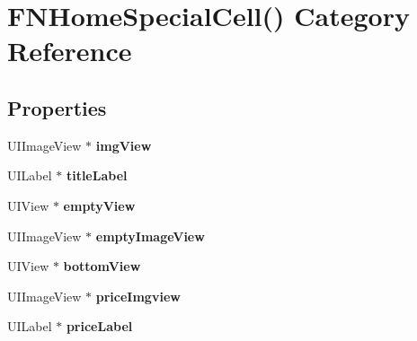 \hypertarget{category_f_n_home_special_cell_07_08}{}\section{F\+N\+Home\+Special\+Cell() Category Reference}
\label{category_f_n_home_special_cell_07_08}
\subsection*{Properties}
\begin{DoxyCompactItemize}
\item 
\mbox{\label{category_f_n_home_special_cell_07_08_af0912094a56bb610add6d24d1e4982bb}} 
U\+I\+Image\+View $\ast$ {\bfseries img\+View}
\item 
\mbox{\label{category_f_n_home_special_cell_07_08_a7600d0d2ad0559ccabb48b75d3b91689}} 
U\+I\+Label $\ast$ {\bfseries title\+Label}
\item 
\mbox{\label{category_f_n_home_special_cell_07_08_a2e7b3476d2f3237d1d7af102e45b6bee}} 
U\+I\+View $\ast$ {\bfseries empty\+View}
\item 
\mbox{\label{category_f_n_home_special_cell_07_08_a4c26b07a8860b2d004eea0a2887d9436}} 
U\+I\+Image\+View $\ast$ {\bfseries empty\+Image\+View}
\item 
\mbox{\label{category_f_n_home_special_cell_07_08_a8065525ad6dcc5e3357d510745ff1689}} 
U\+I\+View $\ast$ {\bfseries bottom\+View}
\item 
\mbox{\label{category_f_n_home_special_cell_07_08_adcf0cddda027276f534a54068550fec7}} 
U\+I\+Image\+View $\ast$ {\bfseries price\+Imgview}
\item 
\mbox{\label{category_f_n_home_special_cell_07_08_a8166e24260c5d0c8d89bae41304f6ace}} 
U\+I\+Label $\ast$ {\bfseries price\+Label}
\item 
\mbox{\label{category_f_n_home_special_cell_07_08_a94ea340737cedb3998aaf51c49f64643}} 

\end{DoxyCompactItemize}
